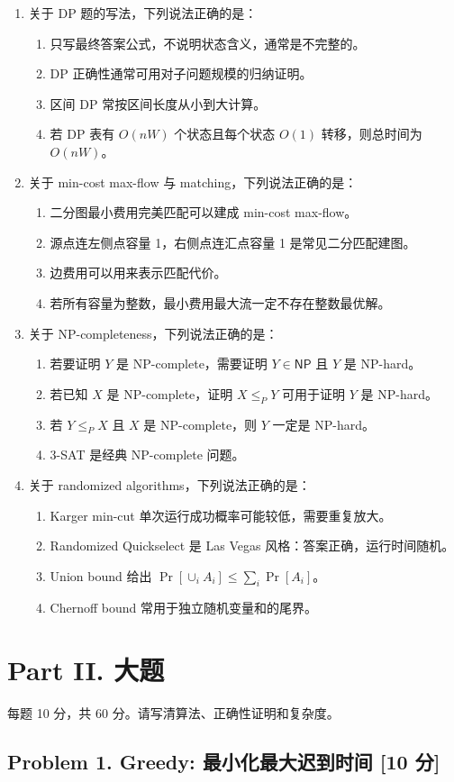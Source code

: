 \documentclass[UTF8,a4paper,11pt]{ctexart}
\newcommand{\choice}[1]{\item[$\square$] #1}
\newcommand{\points}[1]{\hfill{\small\textbf{[#1 分]}}}
\newcommand{\NP}{\mathsf{NP}}
\begin{document}
\begin{enumerate}
  \item 关于 DP 题的写法，下列说法正确的是：
  \begin{enumerate}
    \choice{只写最终答案公式，不说明状态含义，通常是不完整的。}
    \choice{DP 正确性通常可用对子问题规模的归纳证明。}
    \choice{区间 DP 常按区间长度从小到大计算。}
    \choice{若 DP 表有 $O(nW)$ 个状态且每个状态 $O(1)$ 转移，则总时间为 $O(nW)$。}
  \end{enumerate}

  \item 关于 min-cost max-flow 与 matching，下列说法正确的是：
  \begin{enumerate}
    \choice{二分图最小费用完美匹配可以建成 min-cost max-flow。}
    \choice{源点连左侧点容量 1，右侧点连汇点容量 1 是常见二分匹配建图。}
    \choice{边费用可以用来表示匹配代价。}
    \choice{若所有容量为整数，最小费用最大流一定不存在整数最优解。}
  \end{enumerate}

  \item 关于 NP-completeness，下列说法正确的是：
  \begin{enumerate}
    \choice{若要证明 $Y$ 是 NP-complete，需要证明 $Y\in\NP$ 且 $Y$ 是 NP-hard。}
    \choice{若已知 $X$ 是 NP-complete，证明 $X\le_P Y$ 可用于证明 $Y$ 是 NP-hard。}
    \choice{若 $Y\le_P X$ 且 $X$ 是 NP-complete，则 $Y$ 一定是 NP-hard。}
    \choice{3-SAT 是经典 NP-complete 问题。}
  \end{enumerate}

  \item 关于 randomized algorithms，下列说法正确的是：
  \begin{enumerate}
    \choice{Karger min-cut 单次运行成功概率可能较低，需要重复放大。}
    \choice{Randomized Quickselect 是 Las Vegas 风格：答案正确，运行时间随机。}
    \choice{Union bound 给出 $\Pr[\cup_i A_i]\le\sum_i\Pr[A_i]$。}
    \choice{Chernoff bound 常用于独立随机变量和的尾界。}
  \end{enumerate}
\end{enumerate}

\newpage
\section*{Part II. 大题}

每题 10 分，共 60 分。请写清算法、正确性证明和复杂度。

\subsection*{Problem 1. Greedy: 最小化最大迟到时间 \points{10}}
\end{document}
